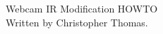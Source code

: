 \documentclass[letterpaper,11pt]{article}
\begin{document}
%
%
\begin{center}
%
{\Huge Webcam IR Modification HOWTO} \\
\vspace*{0.5\baselineskip}
{\footnotesize Written by Christopher Thomas. }
%
\end{center}

%
%

\end{document}
